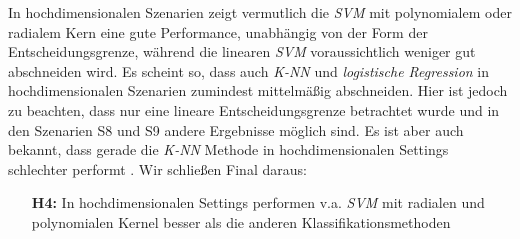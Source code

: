 \documentclass[
]{article}
\begin{document}
In hochdimensionalen Szenarien zeigt vermutlich die \textit{SVM} mit
polynomialem oder radialem Kern eine gute Performance, unabhängig von
der Form der Entscheidungsgrenze, während die linearen \textit{SVM}
voraussichtlich weniger gut abschneiden wird. Es scheint so, dass auch
\textit{K-NN} und \textit{logistische Regression} in hochdimensionalen
Szenarien zumindest mittelmäßig abschneiden. Hier ist jedoch zu
beachten, dass nur eine lineare Entscheidungsgrenze betrachtet wurde und
in den Szenarien S8 und S9 andere Ergebnisse möglich sind. Es ist aber
auch bekannt, dass gerade die \textit{K-NN} Methode in hochdimensionalen
Settings schlechter performt
\parencite{jamesIntroductionStatisticalLearning2021}. Wir schließen
Final daraus:

\begin{minipage}{0.9\linewidth}
\begin{itemize}[leftmargin=0.1\linewidth]
\item[\textbf{H4:}] In hochdimensionalen Settings performen v.a. \textit{SVM} mit radialen und polynomialen Kernel besser als die anderen Klassifikationsmethoden
\end{itemize}
\end{minipage}

\printbibliography
\end{document}
